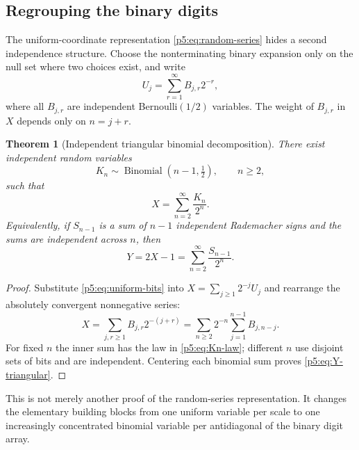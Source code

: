 \documentclass[11pt,oneside]{article}
\newtheorem{theorem}{Theorem}[section]
\theoremstyle{definition}
\begin{document}
\subsection{Regrouping the binary digits}

The uniform-coordinate representation \eqref{p5:eq:random-series} hides a second
independence structure.  Choose the nonterminating binary expansion only on
the null set where two choices exist, and write
\begin{equation}
 U_j=\sum_{r=1}^\infty B_{j,r}2^{-r},                    \label{p5:eq:uniform-bits}
\end{equation}
where all $B_{j,r}$ are independent Bernoulli$(1/2)$ variables.  The weight of
$B_{j,r}$ in $X$ depends only on $n=j+r$.

\begin{theorem}[Independent triangular binomial decomposition]
\label{p5:thm:triangular-binomial}
There exist independent random variables
\begin{equation}
 K_n\sim\operatorname{Binomial}(n-1,\tfrac12),
 \qquad n\ge2,                                           \label{p5:eq:Kn-law}
\end{equation}
such that
\begin{equation}
 \boxed{\displaystyle
 X=\sum_{n=2}^\infty\frac{K_n}{2^n}.}                    \label{p5:eq:X-triangular}
\end{equation}
Equivalently, if $S_{n-1}$ is a sum of $n-1$ independent Rademacher signs and
the sums are independent across $n$, then
\begin{equation}
 \boxed{\displaystyle
 Y=2X-1=\sum_{n=2}^\infty\frac{S_{n-1}}{2^n}.}           \label{p5:eq:Y-triangular}
\end{equation}
\end{theorem}

\begin{proof}
Substitute \eqref{p5:eq:uniform-bits} into
$X=\sum_{j\ge1}2^{-j}U_j$ and rearrange the absolutely convergent nonnegative
series:
\[
 X=\sum_{j,r\ge1}B_{j,r}2^{-(j+r)}
  =\sum_{n\ge2}2^{-n}\sum_{j=1}^{n-1}B_{j,n-j}.
\]
For fixed $n$ the inner sum has the law in \eqref{p5:eq:Kn-law}; different
$n$ use disjoint sets of bits and are independent.  Centering each binomial
sum proves \eqref{p5:eq:Y-triangular}.
\end{proof}

This is not merely another proof of the random-series representation.  It
changes the elementary building blocks from one uniform variable per scale to
one increasingly concentrated binomial variable per antidiagonal of the
binary digit array.
\end{document}

